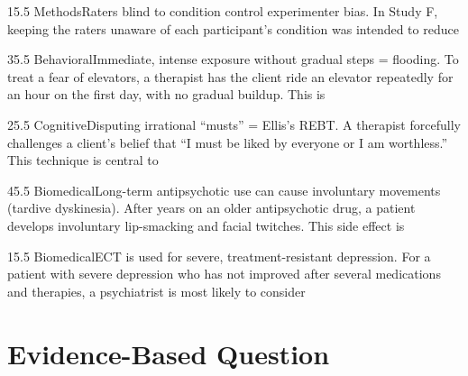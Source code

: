 \documentclass[11pt]{article}
\begin{document}
\begin{q}{1}{5.5 Methods}{Raters blind to condition control experimenter bias.}
In Study F, keeping the raters unaware of each participant's condition was intended to reduce
\end{q}

\begin{q}{3}{5.5 Behavioral}{Immediate, intense exposure without gradual steps = flooding.}
To treat a fear of elevators, a therapist has the client ride an elevator repeatedly for an hour on the first day, with no gradual buildup. This is
\end{q}

\begin{q}{2}{5.5 Cognitive}{Disputing irrational ``musts'' = Ellis's REBT.}
A therapist forcefully challenges a client's belief that ``I must be liked by everyone or I am worthless.'' This technique is central to
\end{q}

\begin{q}{4}{5.5 Biomedical}{Long-term antipsychotic use can cause involuntary movements (tardive dyskinesia).}
After years on an older antipsychotic drug, a patient develops involuntary lip-smacking and facial twitches. This side effect is
\end{q}

\begin{q}{1}{5.5 Biomedical}{ECT is used for severe, treatment-resistant depression.}
For a patient with severe depression who has not improved after several medications and therapies, a psychiatrist is most likely to consider
\end{q}

\section{Evidence-Based Question}
\end{document}
